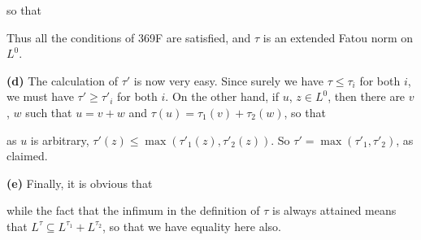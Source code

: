 {
     
\noindent so that
     
     
Thus all the conditions of 369F are satisfied, and $\tau$ is an extended
Fatou norm on $L^0$.
     
\medskip
     
{\bf (d)} The calculation of $\tau'$ is now very easy.   Since surely we
have $\tau\le\tau_i$ for both $i$, we must have $\tau'\ge\tau'_i$ for
both $i$.   On the other hand, if $u$, $z\in L^0$, then there are $v$,
$w$ such that $u=v+w$ and $\tau(u)=\tau_1(v)+\tau_2(w)$, so that
     
     
\noindent as $u$ is arbitrary, $\tau'(z)\le\max(\tau'_1(z),\tau'_2(z))$.
So $\tau'=\max(\tau'_1,\tau'_2)$, as claimed.
     
\medskip
     
{\bf (e)} Finally, it is obvious that
     
     
\noindent while the fact that the infimum in the definition of $\tau$ is
always attained means that $L^{\tau}\subseteq L^{\tau_1}+L^{\tau_2}$, so
that we have equality here also.
}%
         

